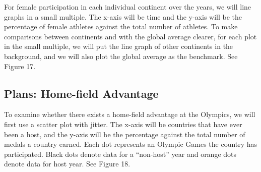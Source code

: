 \documentclass[12pt]{article}
\begin{document}
For female participation in each individual continent over the years, we will line graphs in a small multiple. The x-axis will be time and the y-axis will be the percentage of female athletes against the total number of athletes. To make comparisons between continents and with the global average clearer, for each plot in the small multiple, we will put the line graph of other continents in the background, and we will also plot the global average as the benchmark. See Figure 17.

\subsection{Plans: Home-field Advantage}

To examine whether there exists a home-field advantage at the Olympics, we will first use a scatter plot with jitter. The x-axis will be countries that have ever been a host, and the y-axis will be the percentage against the total number of medals a country earned. Each dot represents an Olympic Games the country has participated. Black dots denote data for a “non-host” year and orange dots denote data for host year. See Figure 18.
\end{document}
